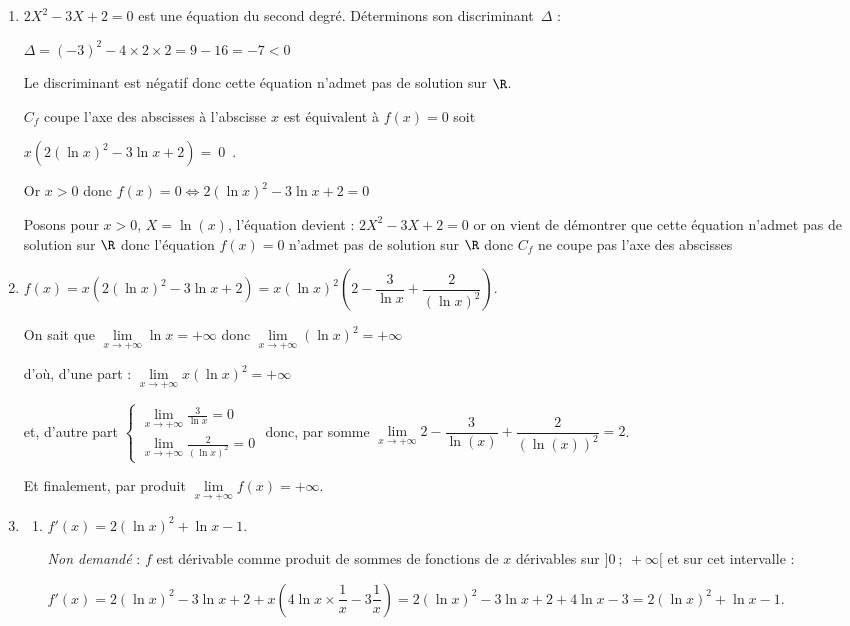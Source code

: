\begin{enumerate}
\item $2X^{2}-3X + 2 = 0$ est une équation du second degré. Déterminons son discriminant~$\Delta$ :

$\Delta = (-3)^2-4 \times 2 \times 2 = 9-16=-7<0$

Le discriminant est négatif donc cette équation n'admet pas de solution sur $\R$.

$C_{f}$ coupe l'axe des abscisses à l'abscisse $x$ est équivalent à $f(x)=0$ soit

$x\left(2(\ln x)^{2}-3 \ln x+2\right)=~0$~.

Or $x >0$ donc $f(x)=0 \iff 2(\ln x)^{2}-3 \ln x+2 =0$

Posons pour $x > 0$, $X=\ln (x)$, l'équation devient : $2X^2-3X+2=0$  or on vient de démontrer que cette équation n'admet pas de solution sur $\R$ donc l'équation $f(x)=0$ n'admet pas de solution sur $\R$  donc  $C_{f}$ ne coupe pas l'axe des abscisses

	\item
	$f(x)=x\left(2(\ln x)^{2}-3 \ln x+2 \right)= x\left( \ln x\right)^2 \left( 2 - \dfrac{3}{\ln x}+\dfrac{2}{(\ln x)^2}\right)$.

	On sait  que $\lim\limits_{x\to +\infty }\ln x =+\infty$ donc $\lim\limits_{x\to +\infty }(\ln x)^2 =+\infty$

	d'où, d'une part : $\lim\limits_{x\to +\infty} x(\ln x)^2 = +\infty$

	et, d'autre part  $\begin{cases}  \lim\limits_{x \to +\infty }\frac{3}{\ln x} =0\\
		\lim\limits_{x\to +\infty } \frac{2}{(\ln x)^2}= 0\end{cases}$  donc, par somme $\lim\limits_{x \to +\infty } 2 - \dfrac{3}{\ln(x)}+\dfrac{2}{(\ln(x))^2} = 2$.

	Et finalement, par produit $\lim\limits_{x \to +\infty } f(x) =+\infty$.

\item
\begin{enumerate}
	\item $f'(x)=2(\ln x)^{2} + \ln x - 1$.
	
\emph{Non demandé} : $f$ est dérivable comme produit de sommes de fonctions de $x$ dérivables sur $]0~;~+ \infty[$ et sur cet intervalle :

$f'(x) = 2(\ln x)^2 - 3\ln x + 2 + x(4\ln x \times \dfrac 1x - 3\dfrac 1x) =  2(\ln x)^2 - 3\ln x + 2 + 4\ln x - 3  = 2(\ln x)^2 + \ln x - 1$.


\end{enumerate}
\end{enumerate}
